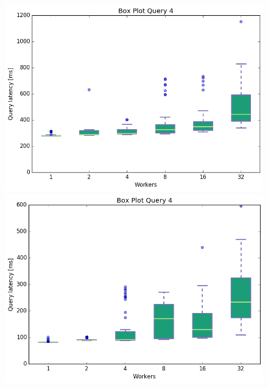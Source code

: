 \documentclass[11pt,singlecolumn]{scrartcl}
\begin{document}
\begin{figure}[!tbp]
  \centering
  \RawFloats
  \begin{minipage}[b]{0.5\textwidth}
    \includegraphics[width=\textwidth]{boxesjl/q4}
  \end{minipage}
  \hfill
  \begin{minipage}[b]{0.5\textwidth}
    \includegraphics[width=\textwidth]{boxesjs/q4}
  \end{minipage}
\end{figure}
\clearpage
\end{document}
